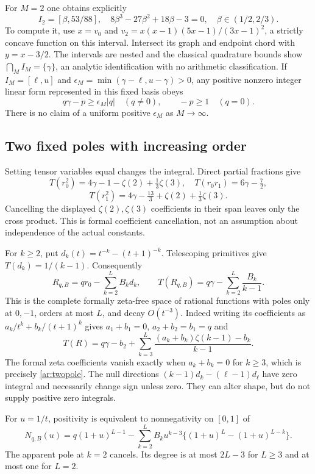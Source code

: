 \documentclass[11pt,a4paper]{article}
\theoremstyle{definition}
\theoremstyle{remark}
\numberwithin{equation}{section}
\begin{document}
For $M=2$ one obtains explicitly
\[
 I_2=[\beta,53/88],\quad
 8\beta^3-27\beta^2+18\beta-3=0,\quad \beta\in(1/2,2/3).
\]
To compute it, use $x=v_0$ and
$v_2=x(x-1)(5x-1)/(3x-1)^2$, a strictly concave function on this interval.
Intersect its graph and endpoint chord with $y=x-3/2$.
The intervals are nested and the classical quadrature bounds show
$\bigcap_MI_M=\{\gamma\}$, an analytic identification with no arithmetic
classification.  If $I_M=[\ell,u]$ and
$\epsilon_M=\min(\gamma-\ell,u-\gamma)>0$, any positive nonzero integer
linear form represented in this fixed basis obeys
\[
 q\gamma-p\ge\epsilon_M|q|\quad(q\ne0),\qquad
 -p\ge1\quad(q=0).
\]
There is no claim of a uniform positive $\epsilon_M$ as $M\to\infty$.

\subsection{Two fixed poles with increasing order}
Setting tensor variables equal changes the integral.  Direct partial
fractions give
\[
 T(r_0^2)=4\gamma-1-\zeta(2)+\tfrac13\zeta(3),\quad
 T(r_0r_1)=6\gamma-\tfrac72,
\]
\[
 T(r_1^2)=4\gamma-\tfrac{13}3+\zeta(2)+\tfrac13\zeta(3).
\]
Cancelling the displayed $\zeta(2),\zeta(3)$ coefficients in their span
leaves only the cross product.  This is formal coefficient cancellation,
not an assumption about independence of the actual constants.

For $k\ge2$, put $d_k(t)=t^{-k}-(t+1)^{-k}$.  Telescoping primitives give
$T(d_k)=1/(k-1)$.  Consequently
\begin{equation}\label{ar:twopole}
 R_{q,B}=qr_0-\sum_{k=2}^LB_kd_k,
 \qquad T(R_{q,B})=q\gamma-\sum_{k=2}^L\frac{B_k}{k-1}.
\end{equation}
This is the complete formally zeta-free space of rational functions with
poles only at $0,-1$, orders at most $L$, and decay $O(t^{-3})$.
Indeed writing its coefficients as $a_k/t^k+b_k/(t+1)^k$ gives
$a_1+b_1=0$, $a_2+b_2=b_1=q$ and
\[
 T(R)=q\gamma-b_2+
 \sum_{k=3}^L\frac{(a_k+b_k)\zeta(k-1)-b_k}{k-1}.
\]
The formal zeta coefficients vanish exactly when $a_k+b_k=0$ for $k\ge3$,
which is precisely \eqref{ar:twopole}.  The null directions
$(k-1)d_k-(\ell-1)d_\ell$ have zero integral and necessarily change sign
unless zero.  They can alter shape, but do not supply positive zero integrals.

For $u=1/t$, positivity is equivalent to nonnegativity on $[0,1]$ of
\begin{equation}\label{ar:twopoly}
 N_{q,B}(u)=q(1+u)^{L-1}-\sum_{k=2}^LB_ku^{k-3}
       \{(1+u)^L-(1+u)^{L-k}\}.
\end{equation}
The apparent pole at $k=2$ cancels.  Its degree is at most $2L-3$ for
$L\ge3$ and at most one for $L=2$.
\end{document}
